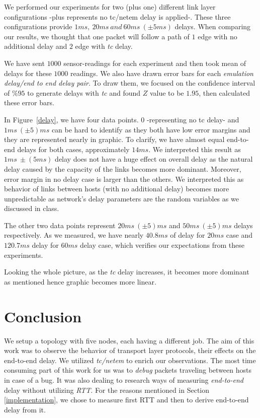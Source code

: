 \documentclass[conference]{IEEEtran}
\begin{document}
\par We performed our experiments for two (plus one) different link layer configurations -plus represents no tc/netem delay is applied-. These three configurations provide $1ms,\ 20ms\ and\ 60ms\ (\pm5ms)$ delays. When comparing our results, we thought that one packet will follow a path of $1$ edge with no additional delay and $2$ edge with \textit{tc} delay. 

\par We have sent $1000$ sensor-readings for each experiment and then took mean of delays for these $1000$ readings. We also have drawn error bars for each \textit{emulation delay/end to end delay pair}. To draw them, we focused on the confidence interval of $\% 95$ to generate delays with \textit{tc} and found $Z$ value to be $1.95$, then calculated these error bars.

\par In  Figure~\ref{delay}, we have four data points. $0$ -representing no tc delay- and $1ms\ (\pm5)ms$ can be hard to identify as they both have low error margins and they are represented nearly in graphic. To clarify, we have almost equal end-to-end delays for both cases, approximately $14ms$. We interpreted this result as $1ms\ \pm(5ms)$ delay does not have a huge effect on overall delay as the natural delay caused by the capacity of the links becomes more dominant. Moreover, error margin in no delay case is larger than the others. We interpreted this as behavior of links between hosts (with no additional delay) becomes more unpredictable as network's delay parameters are the random variables as we discussed in class.

\par The other two data points represent $20ms\ (\pm5)ms$  and $50ms\ (\pm5)ms$ delays respectively. As we measured, we have nearly $40.8ms$ of delay for $20ms$ case and $120.7ms$ delay for $60ms$ delay case, which verifies our expectations from these experiments.

\par Looking the whole picture, as the \textit{tc} delay increases, it becomes more dominant as mentioned hence graphic becomes more linear.

\section{Conclusion}

\par We setup a topology with five nodes, each having a different job. The aim of this work was to observe the behavior of transport layer protocols, their effects on the end-to-end delay. We utilized \textit{tc/netem} to enrich our observations. The most time consuming part of this work for us was to \textit{debug} packets traveling between hosts in case of a bug. It was also dealing to research ways of measuring \textit{end-to-end} delay without utilizing \textit{RTT}. For the reasons mentioned in Section \ref{implementation}, we chose to measure first RTT and then to derive end-to-end delay from it.
\end{document}
